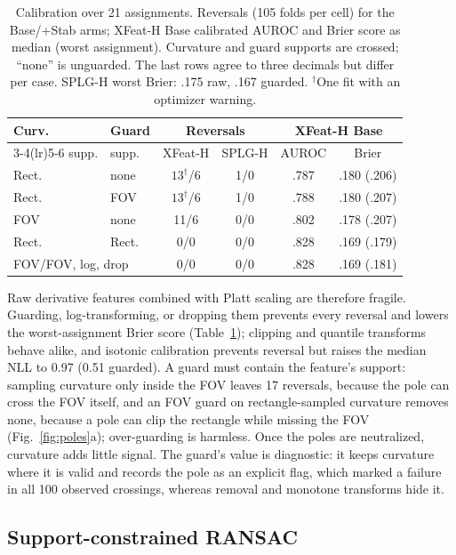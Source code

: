\documentclass{article}
\newcommand{\xf}{XFeat-H}
\newcommand{\splg}{SPLG-H}
\begin{document}
\begin{table}[t]
\centering\small
\caption{Calibration over 21 assignments. Reversals (105 folds per cell) for
the Base/+Stab arms; \xf{} Base calibrated AUROC and Brier score as median
(worst assignment). Curvature and guard supports are crossed; ``none'' is
unguarded. The last rows agree to three decimals but differ per case.
\splg{} worst Brier: .175 raw, .167 guarded.
$^{\dagger}$One fit with an optimizer warning.}
\label{tab:guard}
\setlength{\tabcolsep}{3pt}
\begin{tabular}{llcccc}
\toprule
Curv. & Guard & \multicolumn{2}{c}{Reversals} & \multicolumn{2}{c}{\xf{} Base} \\
\cmidrule(lr){3-4}\cmidrule(lr){5-6}
supp. & supp. & \xf{} & \splg{} & AUROC & Brier \\
\midrule
Rect. & none  & $13^{\dagger}$/6 & 1/0 & .787 & .180 (.206) \\
Rect. & FOV   & $13^{\dagger}$/6 & 1/0 & .788 & .180 (.207) \\
FOV   & none  & 11/6 & 0/0 & .802 & .178 (.207) \\
Rect. & Rect. & 0/0 & 0/0 & .828 & .169 (.179) \\
\midrule
\multicolumn{2}{l}{FOV/FOV, log, drop} & 0/0 & 0/0 & .828 & .169 (.181) \\
\bottomrule
\end{tabular}
\vspace{-3mm}
\end{table}

Raw derivative features combined with Platt scaling are therefore fragile.
Guarding, log-transforming, or dropping them prevents every reversal and lowers
the worst-assignment Brier score (Table~\ref{tab:guard}); clipping and
quantile transforms behave alike, and isotonic calibration \cite{isotonic}
prevents reversal but raises the median NLL to 0.97 (0.51 guarded). A guard must
contain the feature's support: sampling curvature only inside the FOV leaves
17 reversals, because the pole can cross the FOV itself, and an FOV guard on
rectangle-sampled curvature removes none, because a pole can clip the
rectangle while missing the FOV (Fig.~\ref{fig:poles}a); over-guarding is
harmless. Once the poles are neutralized, curvature adds little signal. The
guard's value is diagnostic: it keeps curvature where it is valid and
records the pole as an explicit flag, which marked a failure in all 100
observed crossings, whereas removal and monotone transforms hide it.

\subsection{Support-constrained RANSAC}
\end{document}
